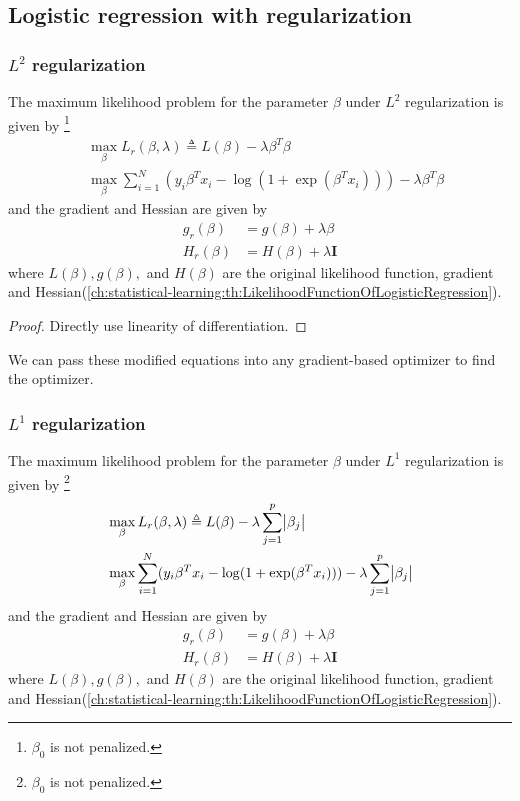 \begin{refsection}
\subsection{Logistic regression with regularization}
\subsubsection{$L^2$ regularization}
\begin{lemma}
	The maximum likelihood problem for the parameter $\beta$ under $L^2$ regularization is given by \footnote{$\beta_0$ is not penalized.}
	\begin{align*}
 &	\max_{\beta} L_r(\beta,\lambda) \triangleq L(\beta) - \lambda \beta^T\beta \\
 & \max_{\beta} \sum_{i=1}^{N} (y_i\beta^Tx_i - \log(1 + \exp(\beta^Tx_i))) - \lambda \beta^T\beta 
	\end{align*}
	and the gradient and Hessian are given by
	\begin{align}
	g_r(\beta) &= g(\beta)+\lambda\beta \\
	H_r(\beta) &= H(\beta)+\lambda\bm{I}
	\end{align}
	where $L(\beta), g(\beta),$ and $H(\beta)$ are the original likelihood function, gradient and Hessian(\autoref{ch:statistical-learning:th:LikelihoodFunctionOfLogisticRegression}).
\end{lemma}
\begin{proof}
	Directly use linearity of differentiation.
\end{proof}

\begin{remark}
	We can pass these modified equations into any gradient-based optimizer to find the optimizer.	
\end{remark}

\subsubsection{$L^1$ regularization}
\begin{lemma}
	The maximum likelihood problem for the parameter $\beta$ under $L^1$ regularization is given by \footnote{$\beta_0$ is not penalized.}
	\begin{align*}
	&	\max_{\beta} L_r(\beta,\lambda) \triangleq L(\beta) - \lambda \sum_{j=1}^p \abs{\beta_j} \\
	& \max_{\beta} \sum_{i=1}^{N} (y_i\beta^Tx_i - \log(1 + \exp(\beta^Tx_i))) - \lambda \sum_{j=1}^p \abs{\beta_j}
	\end{align*}
	and the gradient and Hessian are given by
	\begin{align}
	g_r(\beta) &= g(\beta)+\lambda\beta \\
	H_r(\beta) &= H(\beta)+\lambda\bm{I}
	\end{align}
	where $L(\beta), g(\beta),$ and $H(\beta)$ are the original likelihood function, gradient and Hessian(\autoref{ch:statistical-learning:th:LikelihoodFunctionOfLogisticRegression}).
\end{lemma}




\end{refsection}
